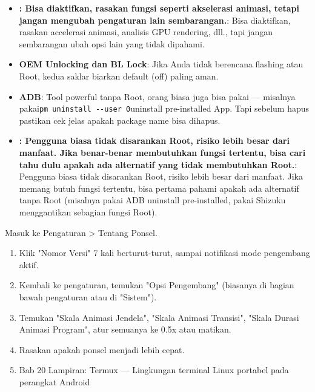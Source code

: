 \begin{itemize}
  \item \textbf{: Bisa diaktifkan, rasakan fungsi seperti akselerasi animasi, tetapi jangan mengubah pengaturan lain sembarangan.}: Bisa diaktifkan, rasakan accelerasi animasi, analisis GPU rendering, dll., tapi jangan sembarangan ubah opsi lain yang tidak dipahami.
  \item \textbf{OEM Unlocking dan BL Lock}: Jika Anda tidak berencana flashing atau Root, kedua saklar biarkan default (off) paling aman.
  \item \textbf{ADB}: Tool powerful tanpa Root, orang biasa juga bisa pakai — misalnya pakai\texttt{pm uninstall -\allowbreak -\allowbreak user 0}uninstall pre-installed App. Tapi sebelum hapus pastikan cek jelas apakah package name bisa dihapus.
  \item \textbf{: Pengguna biasa tidak disarankan Root, risiko lebih besar dari manfaat. Jika benar-benar membutuhkan fungsi tertentu, bisa cari tahu dulu apakah ada alternatif yang tidak membutuhkan Root.}: Pengguna biasa tidak disarankan Root, risiko lebih besar dari manfaat. Jika memang butuh fungsi tertentu, bisa pertama pahami apakah ada alternatif tanpa Root (misalnya pakai ADB uninstall pre-installed, pakai Shizuku menggantikan sebagian fungsi Root).
\end{itemize}

\begin{tcbpractice}{Masuk ke Pengaturan > Tentang Ponsel.}
\begin{enumerate}
  \item Klik "Nomor Versi" 7 kali berturut-turut, sampai notifikasi mode pengembang aktif.
  \item Kembali ke pengaturan, temukan "Opsi Pengembang" (biasanya di bagian bawah pengaturan atau di "Sistem").
  \item Temukan "Skala Animasi Jendela", "Skala Animasi Transisi", "Skala Durasi Animasi Program", atur semuanya ke 0.5x atau matikan.
  \item Rasakan apakah ponsel menjadi lebih cepat.
  \item Bab 20 Lampiran: Termux — Lingkungan terminal Linux portabel pada perangkat Android
\end{enumerate}

\end{tcbpractice}

